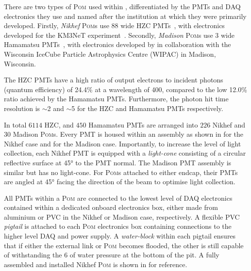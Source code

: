 There are two types of \textsc{Pom} used within \chipsfive, differentiated by the PMTs and DAQ
electronics they use and named after the institution at which they were primarily developed.
Firstly, \emph{Nikhef} \textsc{Pom}s use \SI{88}{} wide HZC PMTs~\cite{hzc}, with
electronics developed for the KM3NeT experiment~\cite{katz2009, adrian2016}. Secondly,
\emph{Madison} \textsc{Pom}s use \SI{3}{} wide Hamamatsu PMTs~\cite{hamamatsu}, with
electronics developed by \chips in collaboration with the Wisconsin IceCube Particle Astrophysics
Centre (WIPAC) in Madison, Wisconsin.

The HZC PMTs have a high ratio of output electrons to incident photons (quantum efficiency) of
24.4\% at a wavelength of \SI{400}{}, compared to the low 12.0\% ratio achieved by the
Hamamatsu PMTs. Furthermore, the photon hit time resolution is $\sim$\SI{2}{} and
$\sim$\SI{5}{} for the HZC and Hamamatsu PMTs respectively.

In total $6114$ HZC, and $450$ Hamamatsu PMTs are arranged into $226$ Nikhef and $30$ Madison
\textsc{Pom}s. Every PMT is housed within an assembly as shown in
 for the Nikhef case and 
for the Madison case. Importantly, to increase the level of light collection, each Nikhef PMT is
equipped with a \emph{light-cone} consisting of a circular reflective surface at \ang{45} to the
PMT normal. The Madison PMT assembly is similar but has no light-cone. For \textsc{Pom}s attached
to either endcap, their PMTs are angled at \ang{45} facing the direction of the beam to optimise
light collection.

All PMTs within a \textsc{Pom} are connected to the lowest level of DAQ electronics contained
within a dedicated onboard electronics box, either made from aluminium or PVC in the Nikhef or
Madison case, respectively. A flexible PVC \emph{pigtail} is attached to each \textsc{Pom}
electronics box containing connections to the higher level DAQ and power supply. A
\emph{water-block} within each pigtail ensures that if either the external link or \textsc{Pom}
becomes flooded, the other is still capable of withstanding the \SI{6}{} of water
pressure at the bottom of the pit. A fully assembled and installed Nikhef \textsc{Pom} is shown in
 for reference.

